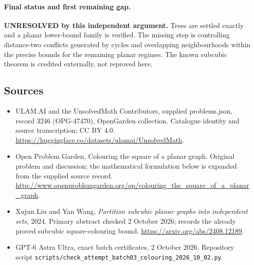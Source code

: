 \documentclass[11pt,a4paper]{article}
\begin{document}
\paragraph{Final status and first remaining gap.}
\textbf{UNRESOLVED by this independent argument.} Trees are settled
exactly and a planar lower-bound family is verified. The missing step
is controlling distance-two conflicts generated by cycles and overlapping
neighbourhoods within the precise bounds for the remaining planar regimes.
The known subcubic theorem is credited externally, not reproved here.

\subsection{Sources}
\begin{itemize}
\item[S1] ULAM.AI and the UnsolvedMath Contributors, supplied problems.json, record 3246 (OPG-47470), OpenGarden collection. Catalogue identity and source transcription; CC BY 4.0.
\url{https://huggingface.co/datasets/ulamai/UnsolvedMath}.
\item[S2] Open Problem Garden, Colouring the square of a planar graph. Original problem and discussion; the mathematical formulation below is expanded from the supplied source record.
\url{http://www.openproblemgarden.org/op/colouring_the_square_of_a_planar_graph}.

\item[R1] Xujun Liu and Yan Wang, \emph{Partition subcubic planar
graphs into independent sets}, 2024. Primary abstract checked 2 October
2026; records the already proved subcubic square-colouring bound.
\url{https://arxiv.org/abs/2408.12189}.
\item[R2] GPT-6 Astra Ultra, exact batch certificates, 2 October 2026.
Repository script \texttt{scripts/check\_attempt\_batch03\_colouring\_2026\_10\_02.py}.

\end{itemize}
\end{document}
